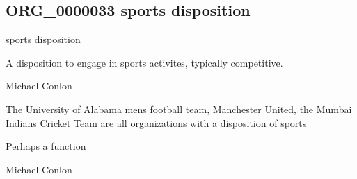 \documentclass[letterpaper,10pt,english]{sphinxmanual}
\begin{document}
\subsection{ORG\_0000033 \sphinxhyphen{} sports disposition}
\label{\detokenize{doc-ORG_0000033:org-0000033-sports-disposition}}\label{\detokenize{doc-ORG_0000033:index-0}}\label{\detokenize{doc-ORG_0000033::doc}}
\begin{sphinxShadowBox}

\sphinxAtStartPar
sports disposition
\end{sphinxShadowBox}

\begin{sphinxShadowBox}

\sphinxAtStartPar
A disposition to engage in sports activites, typically competitive.
\end{sphinxShadowBox}

\begin{sphinxShadowBox}

\sphinxAtStartPar
Michael Conlon 
\end{sphinxShadowBox}

\begin{sphinxShadowBox}

\sphinxAtStartPar
The University of Alabama mens football team, Manchester United, the Mumbai Indians Cricket Team are all organizations with a disposition of sports
\end{sphinxShadowBox}

\begin{sphinxShadowBox}

\sphinxAtStartPar
Perhaps a function
\end{sphinxShadowBox}

\begin{sphinxShadowBox}

\sphinxAtStartPar
Michael Conlon 
\end{sphinxShadowBox}
\begin{quote}

\ignorespaces \end{quote}
\end{document}
